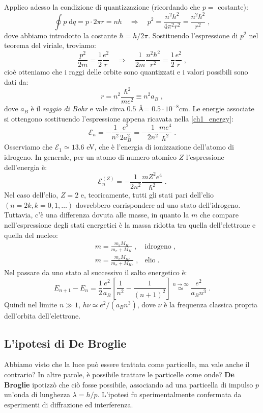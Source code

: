 \documentclass[12pt,a4paper]{report}
\theoremstyle{definition}
\numberwithin{equation}{section}
\newcommand{\diff}[1][]{\mathrm{d}#1}
\begin{document}
Applico adesso la condizione di quantizzazione (ricordando che $p=$ costante):
$$
\oint p\;\diff{q}=p\cdot 2\pi r=nh\quad  \Longrightarrow\quad  p^2=\frac{n^2 h^2}{4\pi^2 r^2}=\frac{n^2 \hbar^2}{r^2}\;,
$$
dove abbiamo introdotto la costante $\hbar=h/2\pi$. Sostituendo l'espressione di $p^2$ nel teorema del viriale, troviamo:
$$
\frac{p^2}{2m}=\frac{1}{2}\frac{e^2}{r}\quad  \Longrightarrow \quad \frac{1}{2m}\frac{n^2\hbar^2}{r^2}=\frac{1}{2}\frac{e^2}{r}\;,
$$
cioè otteniamo che i raggi delle orbite sono quantizzati e i valori possibili sono dati da:
\begin{equation}
r=n^2\frac{\hbar^2}{me^2}\equiv n^2 a_B\;,
\end{equation}
dove $a_B$ è il \textit{raggio di Bohr} e vale circa $0.5$ \AA= $0.5\cdot 10^{-8}$cm. Le energie associate si ottengono sostituendo l'espressione appena ricavata nella \eqref{ch1_energy}:
\begin{equation}
\mathcal{E}_n =-\frac{1}{n^2}\frac{e^2}{2a_B^2}=-\frac{1}{2n^2}\frac{me^4}{\hbar^2}\;.
\end{equation}
Osserviamo che $\mathcal{E}_1\simeq 13.6$ eV, che è l'energia di ionizzazione dell'atomo di idrogeno. In generale, per un atomo di numero atomico $Z$ l'espressione dell'energia è:
\begin{equation}
\mathcal{E}_n^{(Z)}=-\frac{1}{2n^2}\frac{mZ^2e^4}{\hbar^2}\;.
\end{equation}
Nel caso dell'elio, $Z=2$ e, teoricamente, tutti gli stati pari dell'elio $(n=2k, k=0,1,\ldots)$ dovrebbero corrispondere ad uno stato dell'idrogeno. Tuttavia, c'è una differenza dovuta alle masse, in quanto la $m$ che compare nell'espressione degli stati energetici è la massa ridotta tra quella dell'elettrone e quella del nucleo:
\begin{align*}
&m=\frac{m_eM_H}{m_e+M_H}\;, &\mbox{idrogeno}\;, \\
&m=\frac{m_eM_{He}}{m_e+M_{He}}\;, &\mbox{elio}\;.
\end{align*}
Nel passare da uno stato al successivo il salto energetico è:
$$
E_{n+1}-E_n=\frac{1}{2}\frac{e^2}{a_B}\left[\frac{1}{n^2}-\frac{1}{(n+1)^2}\right] \stackrel{n\to\infty}{\simeq} \frac{e^2}{a_Bn^3}\;.
$$
Quindi nel limite $n\gg 1$, $h\nu \simeq e^2/(a_Bn^3)$, dove $\nu$ è la frequenza classica propria dell'orbita dell'elettrone.
\subsection{L'ipotesi di De Broglie}
Abbiamo visto che la luce può essere trattata come particelle, ma vale anche il contrario? In altre parole, è possibile trattare le particelle come onde? \textbf{De Broglie} ipotizzò che ciò fosse possibile, associando ad una particella di impulso $p$ un'onda di lunghezza $\lambda=h/p$. L'ipotesi fu sperimentalmente confermata da esperimenti di diffrazione ed interferenza.
\end{document}
